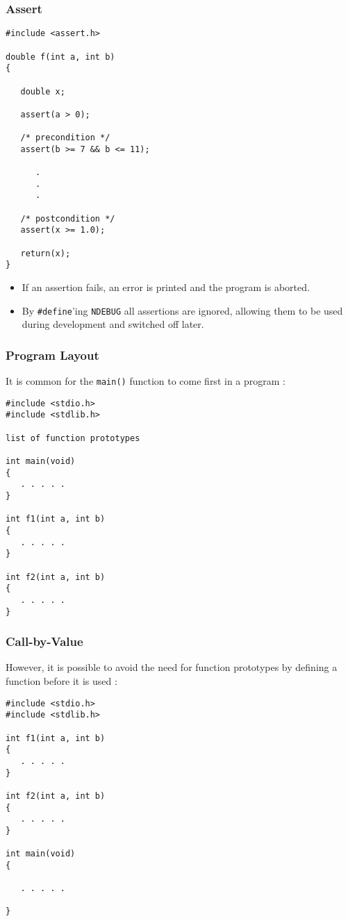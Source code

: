 \begin{frame}[fragile]
\frametitle{Assert}
\begin{verbatim}
#include <assert.h>

double f(int a, int b)
{

   double x;

   assert(a > 0);

   /* precondition */
   assert(b >= 7 && b <= 11);

      .
      .
      .

   /* postcondition */
   assert(x >= 1.0);

   return(x);
}
\end{verbatim}

\begin{itemize}
\item If an assertion fails, an error is printed and the
program is aborted.
\item By \verb^#define^'ing \verb^NDEBUG^ all assertions are
ignored, allowing them to be used during development and switched
off later.
\end{itemize}
\end{frame}

\begin{frame}[fragile]
\frametitle{Program Layout}
It is common for the \verb^main()^ function to come
first in a program :
\begin{verbatim}
#include <stdio.h>
#include <stdlib.h>

list of function prototypes

int main(void)
{
   . . . . .
}

int f1(int a, int b)
{
   . . . . .
}

int f2(int a, int b)
{
   . . . . .
}
\end{verbatim}
\end{frame}

\begin{frame}[fragile]
\frametitle{Call-by-Value}
However, it is possible to avoid the need for function prototypes
by defining a function before it is used :

\begin{verbatim}
#include <stdio.h>
#include <stdlib.h>

int f1(int a, int b)
{
   . . . . .
}

int f2(int a, int b)
{
   . . . . .
}

int main(void)
{

   . . . . .

}
\end{verbatim}
\end{frame}

